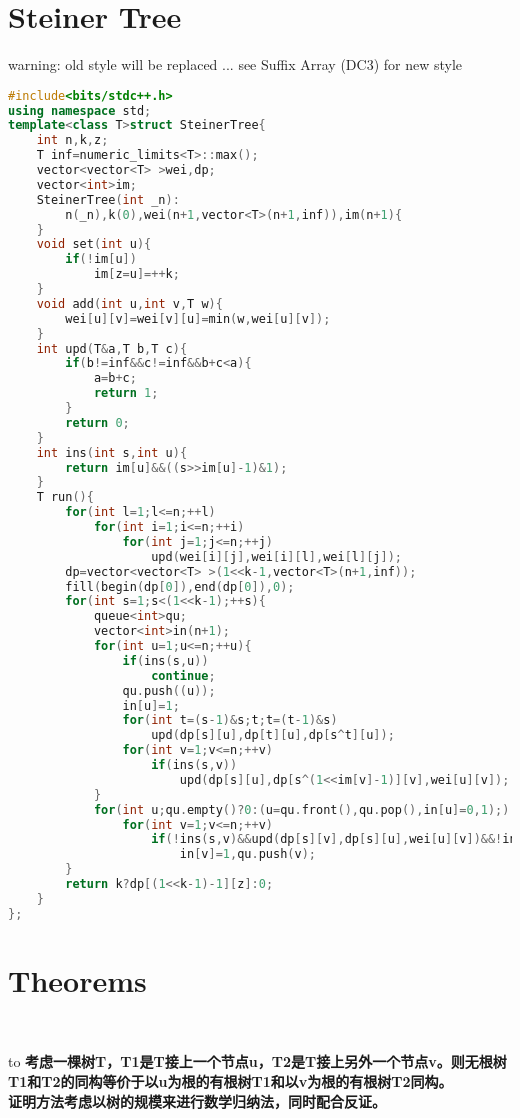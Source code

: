 \documentclass{book}
\begin{document}
\section{Steiner Tree}
warning: old style will be replaced ... see Suffix Array (DC3) for new style\begin{lstlisting}[language=C++,title={Steiner Tree.hpp (1745 bytes, 56 lines)}]
#include<bits/stdc++.h>
using namespace std;
template<class T>struct SteinerTree{
    int n,k,z;
    T inf=numeric_limits<T>::max();
    vector<vector<T> >wei,dp;
    vector<int>im;
    SteinerTree(int _n):
        n(_n),k(0),wei(n+1,vector<T>(n+1,inf)),im(n+1){
    }
    void set(int u){
        if(!im[u])
            im[z=u]=++k;
    }
    void add(int u,int v,T w){
        wei[u][v]=wei[v][u]=min(w,wei[u][v]);
    }
    int upd(T&a,T b,T c){
        if(b!=inf&&c!=inf&&b+c<a){
            a=b+c;
            return 1;
        }
        return 0;
    }
    int ins(int s,int u){
        return im[u]&&((s>>im[u]-1)&1);
    }
    T run(){
        for(int l=1;l<=n;++l)
            for(int i=1;i<=n;++i)
                for(int j=1;j<=n;++j)
                    upd(wei[i][j],wei[i][l],wei[l][j]);
        dp=vector<vector<T> >(1<<k-1,vector<T>(n+1,inf));
        fill(begin(dp[0]),end(dp[0]),0);
        for(int s=1;s<(1<<k-1);++s){
            queue<int>qu;
            vector<int>in(n+1);
            for(int u=1;u<=n;++u){
                if(ins(s,u))
                    continue;
                qu.push((u));
                in[u]=1;
                for(int t=(s-1)&s;t;t=(t-1)&s)
                    upd(dp[s][u],dp[t][u],dp[s^t][u]);
                for(int v=1;v<=n;++v)
                    if(ins(s,v))
                        upd(dp[s][u],dp[s^(1<<im[v]-1)][v],wei[u][v]);
            }
            for(int u;qu.empty()?0:(u=qu.front(),qu.pop(),in[u]=0,1);)
                for(int v=1;v<=n;++v)
                    if(!ins(s,v)&&upd(dp[s][v],dp[s][u],wei[u][v])&&!in[v])
                        in[v]=1,qu.push(v);
        }
        return k?dp[(1<<k-1)-1][z]:0;
    }
};
\end{lstlisting}
\section{Theorems}
﻿\noindent\begin{tabu*} to \textwidth {|X|}
\hline
\bfseries{考虑一棵树T，T1是T接上一个节点u，T2是T接上另外一个节点v。则无根树T1和T2的同构等价于以u为根的有根树T1和以v为根的有根树T2同构。}\\
\hline
证明方法考虑以树的规模来进行数学归纳法，同时配合反证。
\hline
\end{tabu*}\\
\end{document}
